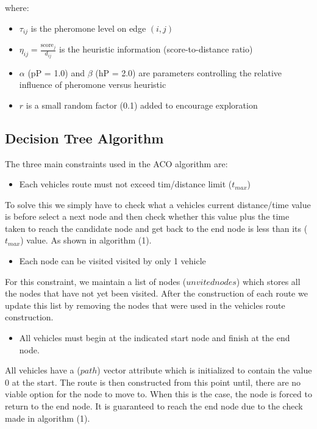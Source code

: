 \documentclass[a4paper,12pt]{article}
\begin{document}
where:
\begin{itemize}
\item $\tau_{ij}$ is the pheromone level on edge $(i,j)$
\item $\eta_{ij} = \frac{\text{score}_j}{d_{ij}}$ is the heuristic information (score-to-distance ratio)
\item $\alpha$ (pP = 1.0) and $\beta$ (hP = 2.0) are parameters controlling the relative influence of pheromone versus heuristic
\item $r$ is a small random factor (0.1) added to encourage exploration
\end{itemize}

\subsection{Decision Tree Algorithm}
The three main constraints used in the ACO algorithm are:
\begin{itemize}
\item Each vehicles route must not exceed tim/distance limit ($t_{max}$)
\end{itemize}
To solve this we simply have to check what a vehicles current distance/time value is before select a next node and then check whether this value plus the time taken to reach the candidate node and get back to the end node is less than its ($t_{max}$) value. As shown in algorithm (1).

\begin{itemize}
\item Each node can be visited visited by only 1 vehicle
\end{itemize}
For this constraint, we maintain a list of nodes ($unvitednodes$) which stores all the nodes that have not yet been visited. After the construction of each route we update this list by removing the nodes that were used in the vehicles route construction.

\begin{itemize}
\item All vehicles must begin at the indicated start node and finish at the end node.
\end{itemize}
All vehicles have a ($path$) vector attribute which is initialized to contain the value 0 at the start. The route is then constructed from this point until, there are no viable option for the node to move to. When this is the case, the node is forced to return to the end node. It is guaranteed to reach the end node due to the check made in algorithm (1).
\end{document}
